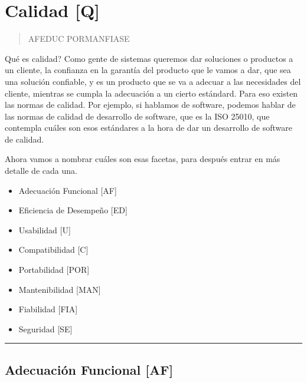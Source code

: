 
\twocolumn
\hypertarget{calidad-q}{%
\section{Calidad [Q]}\label{calidad-q}}


\begin{quote}
AFEDUC PORMANFIASE
\end{quote}

Qué es calidad? Como gente de sistemas queremos dar soluciones o
productos a un cliente, la confianza en la garantía del producto que le
vamos a dar, que sea una solución confiable, y es un producto que se va
a adecuar a las necesidades del cliente, mientras se cumpla la
adecuación a un cierto estándard. Para eso existen las normas de
calidad. Por ejemplo, si hablamos de software, podemos hablar de las
normas de calidad de desarrollo de software, que es la ISO 25010, que
contempla cuáles son esos estándares a la hora de dar un desarrollo de
software de calidad.

Ahora vamos a nombrar cuáles son esas facetas, para después entrar en
más detalle de cada una.

\begin{itemize}
  \setlength\itemsep{-1em}
\item
  Adecuación Funcional {[}AF{]}
\item
  Eficiencia de Desempeño {[}ED{]}
\item
  Usabilidad {[}U{]}
\item
  Compatibilidad {[}C{]}
\item
  Portabilidad {[}POR{]}
\item
  Mantenibilidad {[}MAN{]}
\item
  Fiabilidad {[}FIA{]}
\item
  Seguridad {[}SE{]}
\end{itemize}

\begin{center}\rule{0.5\linewidth}{0.5pt}\end{center}

\hypertarget{adecuaciuxf3n-funcional-af}{%
\subsection{Adecuación Funcional
{[}AF{]}}\label{adecuaciuxf3n-funcional-af}}

